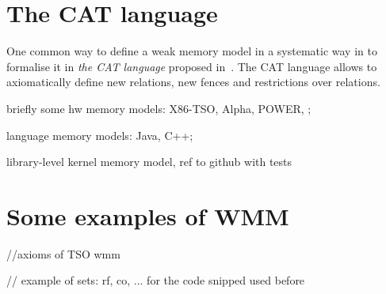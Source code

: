 \section{The CAT language}

One common way to define a weak memory model in a systematic way in to formalise it in \textit{the CAT language} proposed in~\cite{alglave2016syntax}. The CAT language allows to axiomatically define new relations, new fences and restrictions over relations.




briefly some hw memory models: X86-TSO, Alpha, POWER, ;

language memory models: Java, C++;

library-level kernel memory model, ref to github with tests



\section{Some examples of WMM}

//axioms of TSO wmm

// example of sets: rf, co, ... for the code snipped used before

